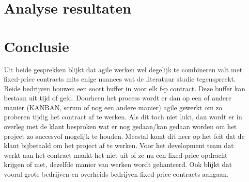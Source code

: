 \documentclass{hogent-article}
\begin{document}
	\section{Analyse resultaten}
	

	
	\section{Conclusie}
	Uit beide gesprekken blijkt dat agile werken wel degelijk te combineren valt met fixed-price contracts mits enige nuances wat de literatuur studie tegenspreekt. Beide bedrijven bouwen een soort buffer in voor elk f-p contract. Deze buffer kan bestaan uit tijd of geld. Doorheen het process wordt er dan op een of andere manier (KANBAN, scrum of nog een andere manier) agile gewerkt om zo proberen tijdig het contract af te werken. Als dit toch niet lukt, dan wordt er in overleg met de klant besproken wat er nog gedaan/kan gedaan worden om het project zo succesvol mogelijk te houden. Meestal komt dit neer op het feit dat de klant bijbetaald om het project af te werken. Voor het development team dat werkt aan het contract maakt het niet uit of ze nu een fixed-price opdracht krijgen of niet, dezelfde manier van werken wordt gehanteerd. Ook blijkt dat vooral grote bedrijven en overheids bedrijven fixed-price contracts aangaan.

	
	
	\printbibliography[heading=bibintoc]
	
\end{document}

